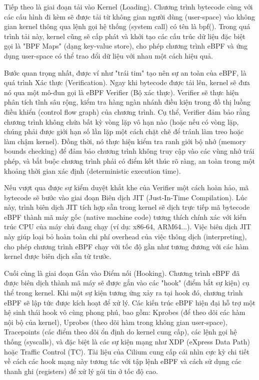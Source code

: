 \documentclass[../DoAn.tex]{subfiles}
\begin{document}
Tiếp theo là giai đoạn tải vào Kernel (Loading). Chương trình bytecode cùng với các cấu hình đi kèm sẽ được tải từ không gian người dùng (user-space) vào không gian kernel thông qua lệnh gọi hệ thống (system call) có tên là bpf(). Trong quá trình tải này, kernel cũng sẽ cấp phát và khởi tạo các cấu trúc dữ liệu đặc biệt gọi là "BPF Maps" (dạng key-value store), cho phép chương trình eBPF và ứng dụng user-space có thể trao đổi dữ liệu với nhau một cách hiệu quả.

Bước quan trọng nhất, được ví như "trái tim" tạo nên sự an toàn của eBPF, là quá trình Xác thực (Verification). Ngay khi bytecode được tải lên, kernel sẽ đưa nó qua một mô-đun gọi là eBPF Verifier (Bộ xác thực). Verifier sẽ thực hiện phân tích tĩnh sâu rộng, kiểm tra hàng ngàn nhánh điều kiện trong đồ thị luồng điều khiển (control flow graph) của chương trình. Cụ thể, Verifier đảm bảo rằng chương trình không chứa bất kỳ vòng lặp vô hạn nào (hoặc nếu có vòng lặp, chúng phải được giới hạn số lần lặp một cách chặt chẽ để tránh làm treo hoặc làm chậm kernel). Đồng thời, nó thực hiện kiểm tra ranh giới bộ nhớ (memory bounds checking) để đảm bảo chương trình không truy cập vào các vùng nhớ trái phép, và bắt buộc chương trình phải có điểm kết thúc rõ ràng, an toàn trong một khoảng thời gian xác định (deterministic execution time).

Nếu vượt qua được sự kiểm duyệt khắt khe của Verifier một cách hoàn hảo, mã bytecode sẽ bước vào giai đoạn Biên dịch JIT (Just-In-Time Compilation). Lúc này, trình biên dịch JIT tích hợp sẵn trong kernel sẽ dịch trực tiếp mã bytecode eBPF thành mã máy gốc (native machine code) tương thích chính xác với kiến trúc CPU của máy chủ đang chạy (ví dụ: x86-64, ARM64...). Việc biên dịch JIT này giúp loại bỏ hoàn toàn chi phí overhead của việc thông dịch (interpreting), cho phép chương trình eBPF chạy với tốc độ gần như tương đương với các hàm kernel được biên dịch sẵn từ trước.

Cuối cùng là giai đoạn Gắn vào Điểm nối (Hooking). Chương trình eBPF đã được biên dịch thành mã máy sẽ được gắn vào các "hook" (điểm bắt sự kiện) cụ thể trong kernel. Khi một sự kiện tương ứng xảy ra tại hook đó, chương trình eBPF sẽ lập tức được kích hoạt để xử lý. Các kiến trúc eBPF hiện đại hỗ trợ một hệ sinh thái hook vô cùng phong phú, bao gồm: Kprobes (để theo dõi các hàm nội bộ của kernel), Uprobes (theo dõi hàm trong không gian user-space), Tracepoints (các điểm theo dõi ổn định do kernel cung cấp), các lệnh gọi hệ thống (syscalls), và đặc biệt là các sự kiện mạng như XDP (eXpress Data Path) hoặc Traffic Control (TC). Tài liệu của Cilium cung cấp cái nhìn cực kỳ chi tiết về cách các hook mạng này tương tác với tập lệnh eBPF và cách sử dụng các thanh ghi (registers) để xử lý gói tin ở tốc độ cao.
\end{document}

